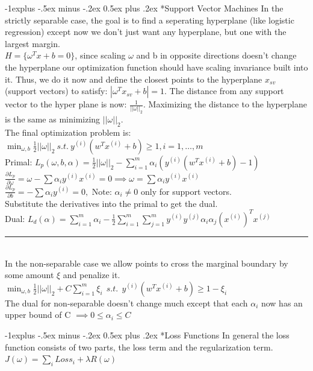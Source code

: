 \documentclass[3pt,landscape]{article}
\makeatletter
\renewcommand{\subsection}{\@startsection{subsection}{2}{0mm}%
                            {-1explus -.5ex minus -.2ex}%
                            {0.5ex plus .2ex}%
                            {\normalfont\normalsize\bfseries}}
\makeatother
\begin{document}
\begin{multicols}{3}
\subsection*{Support Vector Machines}
In the strictly separable case, the goal is to find a seperating hyperplane (like logistic regression) except now we don't just want any hyperplane, but one with the largest margin. \\
$H=\{\omega^Tx+b=0\}$, since scaling $\omega$ and b in opposite directions doesn't change the hyperplane our optimization function should have scaling invariance built into it. Thus, we do it now and define the closest points to the hyperplane $x_{sv}$ (support vectors) to satisfy: $|\omega^Tx_{sv}+b|=1$. The distance from any support vector to the hyper plane is now: $\frac{1}{||\omega||_2}$. Maximizing the distance to the hyperplane is the same as minimizing $||\omega||_2$.\\
The final optimization problem is: $\boxed{\min_{\omega,b} \frac{1}{2}||\omega||_2\ s.t.\ y^{(i)}(w^Tx^{(i)}+b)\ge1, i=1,\dots,m}$\\
Primal: $L_p(\omega,b,\alpha)=\frac{1}{2}||\omega||_2-\sum_{i=1}^m\alpha_i(y^{(i)}(w^Tx^{(i)}+b)-1)$\\
$\frac{\partial L_p}{\partial\omega}=\omega-\sum \alpha_iy^{(i)}x^{(i)}=0 \implies \omega=\sum \alpha_iy^{(i)}x^{(i)}$\\
$\frac{\partial L_p}{\partial b}=-\sum \alpha_iy^{(i)}=0, \text{\ \ \ Note: }\alpha_i\ne 0$ only for support vectors.\\
Substitute the derivatives into the primal to get the dual.\\
Dual: $L_d(\alpha)=\sum_{i=1}^m\alpha_i-\frac{1}{2}\sum_{i=1}^m\sum_{j=1}^my^{(i)}y^{(j)}\alpha_i\alpha_j(x^{(i)})^Tx^{(j)}$
\rule{1\linewidth}{0.1pt}\\
In the non-separable case we allow points to cross the marginal boundary by some amount $\xi$ and penalize it.\\
$\boxed{\min_{\omega,b} \frac{1}{2}||\omega||_2+C\sum_{i=1}^m\xi_i\ \ s.t.\ \ y^{(i)}(w^Tx^{(i)}+b)\ge1-\xi_i}$\\
The dual for non-separable doesn't change much except that each $\alpha_i$ now has an upper bound of C $\implies 0\le\alpha_i\le C$

\subsection*{Loss Functions}
In general the loss function consists of two parts, the loss term and the regularization term. $J(\omega)=\sum_i Loss_i + \lambda R(\omega)$


\end{multicols}
\end{document}
